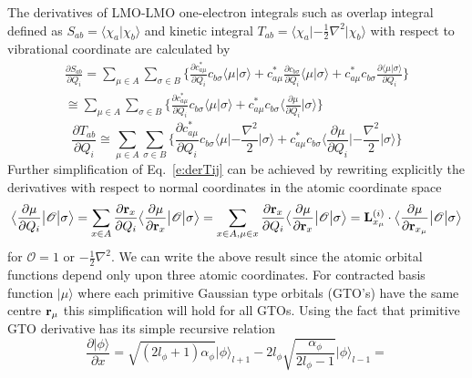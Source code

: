 \documentclass[b5paper,oneside,fleqn,11pt]{book}
\newcommand{\ket}[1]{\ensuremath{\bigr\rvert {#1} \bigr\rangle}}
\newcommand{\braket}[2]{\ensuremath{\bigl\langle {#1} \bigl\lvert {#2} \bigr\rangle}}
\newcommand{\tbraket}[3]{\ensuremath{\bigl\langle {#1} \bigl\lvert {#2} \bigl\lvert {#3} \bigr\rangle}}
\newcommand{\fderiv}[2]{\ensuremath{
    \frac{\partial #1}{\partial #2}}}
\begin{document}
\begin{refsection}
The derivatives of LMO-LMO one-electron integrals 
such as overlap integral defined as $S_{ab}=\langle \chi_a\vert\chi_b\rangle$ 
and kinetic integral 
$T_{ab}=\langle \chi_a\lvert-\frac{1}{2}\nabla^2\rvert\chi_b\rangle$
with respect to vibrational coordinate are calculated by
%
\begin{multline}\label{e:derSij}
\fderiv{S_{ab}}{Q_i} = 
\sum_{\mu \in A} \sum_{\sigma \in B} 
\Big\{
\fderiv{c_{a\mu}^*}{Q_i} c_{b\sigma} \braket{\mu}{\sigma} +
c_{a\mu}^* \fderiv{c_{b\sigma}}{Q_i} \braket{\mu}{\sigma} + 
c_{a\mu}^* c_{b\sigma}  \fderiv{\braket{\mu}{\sigma}}{Q_i}
\Big\}
\\ \cong
\sum_{\mu \in A} \sum_{\sigma \in B} 
\Big\{
\fderiv{c_{a\mu}^*}{Q_i} c_{b\sigma} \braket{\mu}{\sigma} +
c_{a\mu}^* c_{b\sigma}   \braket{\fderiv{\mu}{Q_i}}{\sigma}
\Big\}
\end{multline}
%
\begin{equation}\label{e:derTij}
\fderiv{T_{ab}}{Q_i}  \cong
\sum_{\mu \in A} \sum_{\sigma \in B} 
\Big\{
\fderiv{c_{a\mu}^*}{Q_i} c_{b\sigma} \tbraket{\mu}{ -\frac{\nabla^2}{2} }{\sigma} +
c_{a\mu}^* c_{b\sigma}   \tbraket{\fderiv{\mu}{Q_i}}{ -\frac{\nabla^2}{2} }{\sigma}
\Big\}
\end{equation}
%
Further simplification of Eq.~\eqref{e:derTij} 
can be achieved by rewriting explicitly the derivatives 
with respect to normal coordinates in the atomic coordinate space 
%
\begin{equation}\label{e:derXij}
\tbraket{\fderiv{\mu}{Q_i}}{ \mathscr{O} }{\sigma} = 
\sum_{x \in A} \fderiv{{\bf r}_x}{Q_i} \tbraket{\fderiv{\mu}{{\bf r}_x}}{ \mathscr{O} }{\sigma} =
\sum_{x \in A, \mu \in x} \fderiv{{\bf r}_x}{Q_i} \tbraket{\fderiv{\mu}{{\bf r}_x}}{ \mathscr{O} }{\sigma} =
{\bf L}^{(i)}_{x_\mu} \cdot \tbraket{\fderiv{\mu}{{\bf r}_{x_\mu}}}{ \mathscr{O} }{\sigma}
\end{equation}
%
for $\mathscr{O}=1$ or $-\frac{1}{2}\nabla^2$.
We can write the above result since the atomic orbital functions depend only upon three atomic coordinates. For contracted 
basis function $\ket{\mu}$ where each primitive Gaussian type orbitals (GTO's) have the same centre
${\bf r}_\mu$ this simplification will hold for all GTOs. Using the fact that primitive GTO derivative
has its simple recursive relation
%
\begin{equation}\label{e:orbder}
\fderiv{\ket{\phi}} {x} = 
\sqrt{\left( 2l_\phi + 1 \right)\alpha_\phi} \ket{\phi}_{l+1} -
2l_\phi \sqrt{\frac{\alpha_\phi}{2l_\phi-1}} \ket{\phi}_{l-1} =

\end{equation}
\end{refsection}
\end{document}
